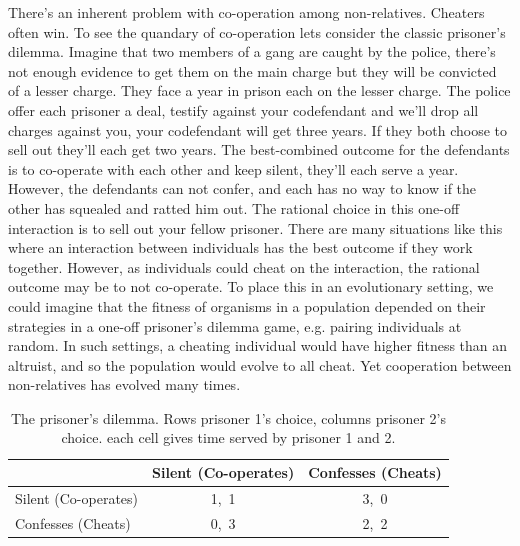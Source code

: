 There's an inherent problem with co-operation among non-relatives. Cheaters often win.  To see the quandary of co-operation lets consider the classic prisoner's dilemma. Imagine that two members of a gang are caught by the police, there's not enough evidence to get them on the main charge but they will be convicted of a lesser charge. They face a year in prison each on the lesser charge. The police offer each prisoner a deal, testify against your codefendant and we'll drop all charges against you, your codefendant will get three years.  If they both choose to sell out they'll each get two years. The best-combined outcome for the defendants is to co-operate with each other and keep silent, they'll each serve a year. However, the defendants can not confer, and each has no way to know if the other has squealed and ratted him out. The rational choice in this one-off interaction is to sell out your fellow prisoner. There are many situations like this where an interaction between individuals has the best outcome if they work together. However, as individuals could cheat on the interaction, the rational outcome may be to not co-operate. To place this in an evolutionary setting, we could imagine that the fitness of organisms in a population depended on their strategies in a one-off prisoner's dilemma game, e.g. pairing individuals at random. In such settings, a cheating individual would have higher fitness than an altruist, and so the population would evolve to all cheat.  Yet cooperation between non-relatives has evolved many times. 

\begin{table}
\begin{tabular}{l|*{2}{c}}\hline
  & Silent (Co-operates) & Confesses (Cheats)\\ \hline
Silent (Co-operates)  & 1,~1 & 3,~0 \\  %
Confesses (Cheats) & 0,~3 & 2,~2\\      %
\end{tabular}
\caption{The prisoner's  dilemma. Rows prisoner 1's choice, columns prisoner 2's choice. each cell gives time served by prisoner 1 and 2.}
\end{table}

